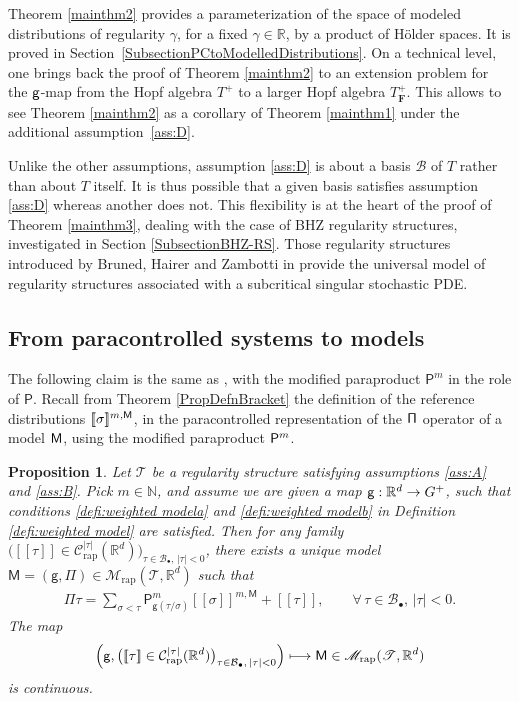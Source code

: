 \documentclass[10pt]{amsart}
\newcommand\mto{\mathchoice{\longmapsto}{\mapsto}{\mapsto}{\mapsto}}
\newcommand{\sbullet}{{\scriptscriptstyle\bullet}}
\theoremstyle{plain}
\newtheorem{prop}[thm]{Proposition}
\theoremstyle{definition}
\newcommand{\Brac}[1]{[\![#1]\!]}
\newcommand{\rap}{\mathrm{rap}}
\newcommand{\sfM}{\mathsf{M}}
\newcommand{\sfP}{\mathsf{P}}
\newcommand{\sfg}{\mathsf{g}}
\newcommand{\sfPi}{\mathsf{\Pi}}
\newcommand{\bsF}{\boldsymbol{F}}
\newcommand{\scrM}{\mathscr{M}}
\newcommand{\scrT}{\mathscr{T}}
\newcommand{\bbN}{\mathbb{N}}
\newcommand{\bbR}{\mathbb{R}}
\newcommand{\mcB}{\mathcal{B}}
\newcommand{\mcC}{\mathcal{C}}
\begin{document}
Theorem \ref{mainthm2} provides a parameterization of the space of modeled distributions of regularity $\gamma$, for a fixed $\gamma\in\bbR$, by a product of Hölder spaces. It is proved in Section~\ref{SubsectionPCtoModelledDistributions}. On a technical level, one brings back the proof of Theorem \ref{mainthm2} to an extension problem for the $\sf g$-map from the Hopf algebra $T^+$ to a larger Hopf algebra $T^+_{\bsF}$. This allows to see Theorem \ref{mainthm2} as a corollary of Theorem \ref{mainthm1} under the additional assumption~\eqref{ass:D}.

Unlike the other assumptions, assumption \eqref{ass:D} is about a basis $\mcB$ of $T$ rather than about $T$ itself. It is thus possible that a given basis satisfies assumption \eqref{ass:D} whereas another does not. This flexibility is at the heart of the proof of Theorem \ref{mainthm3}, dealing with the case of BHZ regularity structures, investigated in Section \ref{SubsectionBHZ-RS}. Those regularity structures introduced by Bruned, Hairer and Zambotti in \cite{BHZ} provide the universal model of regularity structures associated with a subcritical singular stochastic PDE.

\subsection{From paracontrolled systems to models}
\label{SubsectionPCtoModels}

The following claim is the same as \cite[Cor.\,15]{BH}, with the modified paraproduct $\sfP^m$ in the role of $\sfP$. Recall from Theorem \ref{PropDefnBracket} the definition of the reference distributions $\Brac{\sigma}^{m,\sf M}$, in the paracontrolled representation of the $\sf \Pi$ operator of a model $\sf M$, using the modified paraproduct ${\sf P}^m$.

\begin{prop} \label{modifiedCorUniqueExtension}
Let $\scrT$ be a regularity structure satisfying assumptions \eqref{ass:A} and \eqref{ass:B}. Pick $m\in\bbN$, and assume we are given a map ${\sf g}:\bbR^d\to G^+$, such that conditions \eqref{defi:weighted modela} and \eqref{defi:weighted modelb} in Definition \ref{defi:weighted model} are satisfied. Then for any family $\bigl(\Brac{\tau}\in \mcC_\rap^{|\tau|}(\bbR^d)\bigr)_{\tau\in\mcB_\sbullet,\, |\tau|<0}$, there exists a unique model $\sfM=(\sfg,\sfPi)\in\scrM_\rap(\scrT,\bbR^d)$ such that
\begin{align} \label{modifiedCorUniqueExtension:formula}
\sfPi\tau = \sum_{\sigma<\tau} \sfP^m_{\sfg(\tau/\sigma)}\Brac{\sigma}^{m,\sfM} + \Brac{\tau}, \qquad \forall\,\tau\in\mcB_\sbullet, \,\vert\tau\vert<0.
\end{align}
The map
\[
\Bigl(\sfg, \bigl(\Brac{\tau}\in \mcC_\rap^{|\tau|}(\bbR^d)\bigr)_{\tau\in\mcB_\sbullet,\, |\tau|<0}\Bigr) \mto {\sf M} \in \scrM_\rap(\scrT,\bbR^d)
\]
is continuous.
\end{prop}
\end{document}
